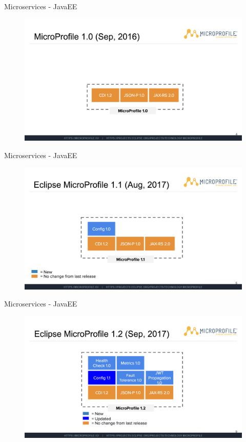 \documentclass{beamer}
\begin{document}
\begin{frame}{Microservices - JavaEE}
\begin{figure}
	\centering
	\includegraphics[width=\linewidth]{Images/mp1}
\end{figure}
\end{frame}

\begin{frame}{Microservices - JavaEE}
\begin{figure}
	\centering
	\includegraphics[width=\linewidth]{Images/mp2}
\end{figure}
\end{frame}

\begin{frame}{Microservices - JavaEE}
\begin{figure}
	\centering
	\includegraphics[width=\linewidth]{Images/mp3}
\end{figure}
\end{frame}
\end{document}
